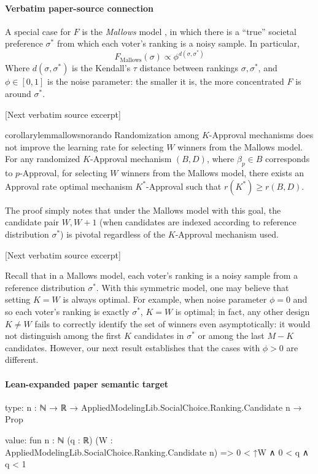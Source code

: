 \documentclass[10pt]{article}
\begin{document}
\paragraph{Verbatim paper-source connection}
\begin{ReviewVerbatim}
A special case for $F$ is the \textit{Mallows} model \cite{mallows1957non}, in which there is a ``true'' societal preference $\sigma^*$ from which each voter's ranking is a noisy sample. In particular,
\[
F_\text{Mallows}(\sigma) \propto {\phi^{d(\sigma, \sigma^*)}}
\]
Where $d(\sigma, \sigma^*)$ is the Kendall's $\tau$ distance between rankings $\sigma, \sigma^*$, and $\phi \in [0,1]$ is the noise parameter: the smaller it is, the more concentrated $F$ is around $\sigma^*$.

[Next verbatim source excerpt]

\begin{restatable}{corollary}{lemmallowsnorando}
	\label{lem:mallowsnorando}
			Randomization among $K$-Approval mechanisms does not improve the learning rate for selecting $W$ winners from the Mallows model. For any randomized $K$-Approval mechanism $(B,D)$, where $\beta_p\in B$ corresponds to $p$-Approval, for selecting $W$ winners from the Mallows model, there exists an Approval rate optimal mechanism $K^*$-Approval such that $r(K^*) \geq r(B,D)$.

\end{restatable}

The proof simply notes that under the Mallows model with this goal, the candidate pair $W, W+1$ (when candidates are indexed according to reference distribution $\sigma^*$) is pivotal regardless of the $K$-Approval mechanism used.

[Next verbatim source excerpt]

Recall that in a Mallows model, each voter's ranking is a noisy sample from a reference distribution $\sigma^*$. With this symmetric model, one may believe that setting $K=W$ is always optimal. For example, when noise parameter $\phi = 0$ and so each voter's ranking is exactly $\sigma^*$, $K=W$ is optimal; in fact, any other design $K \neq W$ fails to correctly identify the set of winners even asymptotically: it would not distinguish among the first $K$ candidates in $\sigma^*$ or among the last $M-K$ candidates. However, our next result establishes that the cases with $\phi > 0$ are different.
\end{ReviewVerbatim}



\paragraph{Lean-expanded paper semantic target}
\begin{ReviewVerbatim}
type:
{n : ℕ} → ℝ → AppliedModelingLib.SocialChoice.Ranking.Candidate n → Prop

value:
fun {n : ℕ} (q : ℝ) (W : AppliedModelingLib.SocialChoice.Ranking.Candidate n) => 0 < ↑W ∧ 0 < q ∧ q < 1
\end{ReviewVerbatim}
\end{document}
